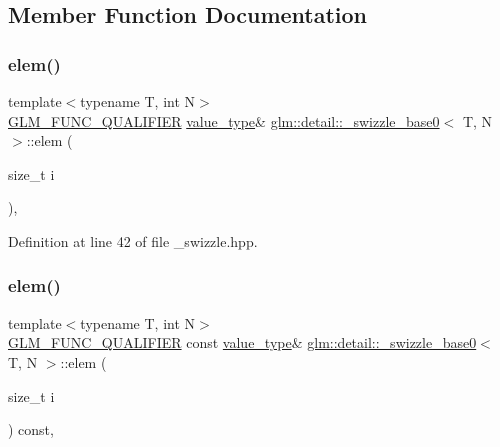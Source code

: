 \subsection{Member Function Documentation}
\mbox{\label{structglm_1_1detail_1_1__swizzle__base0_aebd942a3c3289f9876a9ede4d710d8f0}} 
\subsubsection{\texorpdfstring{elem()}{elem()}\hspace{0.1cm}{\footnotesize\ttfamily [1/2]}}
{\footnotesize\ttfamily template$<$typename T, int N$>$ \\
\hyperlink{setup_8hpp_a33fdea6f91c5f834105f7415e2a64407}{G\+L\+M\+\_\+\+F\+U\+N\+C\+\_\+\+Q\+U\+A\+L\+I\+F\+I\+ER} \hyperlink{structglm_1_1detail_1_1__swizzle__base0_ad38a739e1fe6d2db2674f34c98159c8f}{value\+\_\+type}\& \hyperlink{structglm_1_1detail_1_1__swizzle__base0}{glm\+::detail\+::\+\_\+swizzle\+\_\+base0}$<$ T, N $>$\+::elem (\begin{DoxyParamCaption}\item[{size\+\_\+t}]{i }\end{DoxyParamCaption})\hspace{0.3cm}{\ttfamily [inline]}, {\ttfamily [protected]}}



Definition at line 42 of file \+\_\+swizzle.\+hpp.

\mbox{\label{structglm_1_1detail_1_1__swizzle__base0_abf46336858a3726456386a2c1cd9a62a}} 
\subsubsection{\texorpdfstring{elem()}{elem()}\hspace{0.1cm}{\footnotesize\ttfamily [2/2]}}
{\footnotesize\ttfamily template$<$typename T, int N$>$ \\
\hyperlink{setup_8hpp_a33fdea6f91c5f834105f7415e2a64407}{G\+L\+M\+\_\+\+F\+U\+N\+C\+\_\+\+Q\+U\+A\+L\+I\+F\+I\+ER} const \hyperlink{structglm_1_1detail_1_1__swizzle__base0_ad38a739e1fe6d2db2674f34c98159c8f}{value\+\_\+type}\& \hyperlink{structglm_1_1detail_1_1__swizzle__base0}{glm\+::detail\+::\+\_\+swizzle\+\_\+base0}$<$ T, N $>$\+::elem (\begin{DoxyParamCaption}\item[{size\+\_\+t}]{i }\end{DoxyParamCaption}) const\hspace{0.3cm}{\ttfamily [inline]}, {\ttfamily [protected]}}



